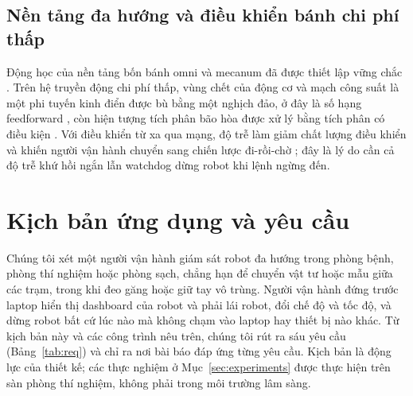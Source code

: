 \documentclass[5p,twocolumn]{elsarticle}
\begin{document}
\subsection{Nền tảng đa hướng và điều khiển bánh chi phí thấp}
Động học của nền tảng bốn bánh omni và mecanum đã được thiết lập vững chắc \cite{siegwart2011,lynch2017,taheri2015}. Trên hệ truyền động chi phí thấp, vùng chết của động cơ và mạch công suất là một phi tuyến kinh điển được bù bằng một nghịch đảo, ở đây là số hạng feedforward \cite{tao1996}, còn hiện tượng tích phân bão hòa được xử lý bằng tích phân có điều kiện \cite{astrom2006}. Với điều khiển từ xa qua mạng, độ trễ làm giảm chất lượng điều khiển và khiến người vận hành chuyển sang chiến lược đi-rồi-chờ \cite{ferrell1965,lane2002}; đây là lý do cần cả độ trễ khứ hồi ngắn lẫn watchdog dừng robot khi lệnh ngừng đến.

\section{Kịch bản ứng dụng và yêu cầu}\label{sec:application}
Chúng tôi xét một người vận hành giám sát robot đa hướng trong phòng bệnh, phòng thí nghiệm hoặc phòng sạch, chẳng hạn để chuyển vật tư hoặc mẫu giữa các trạm, trong khi đeo găng hoặc giữ tay vô trùng. Người vận hành đứng trước laptop hiển thị dashboard của robot và phải lái robot, đổi chế độ và tốc độ, và dừng robot bất cứ lúc nào mà không chạm vào laptop hay thiết bị nào khác. Từ kịch bản này và các công trình nêu trên, chúng tôi rút ra sáu yêu cầu (Bảng~\ref{tab:req}) và chỉ ra nơi bài báo đáp ứng từng yêu cầu. Kịch bản là động lực của thiết kế; các thực nghiệm ở Mục~\ref{sec:experiments} được thực hiện trên sàn phòng thí nghiệm, không phải trong môi trường lâm sàng.
\end{document}
